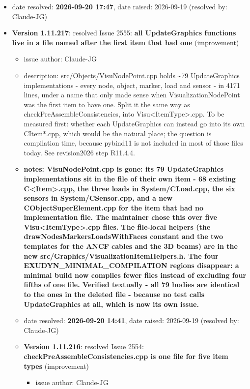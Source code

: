\begin{itemize}
\begin{itemize}
\begin{itemize}
\begin{itemize}
    \item   date resolved: {\bf 2026-09-20 17:47},
date raised: 2026-09-19 (resolved by: Claude-JG)
  \ei
  \item[] {\bf Version 1.11.217}:  resolved Issue 2555: {\bf all UpdateGraphics functions live in a file named after the first item that had one}
(improvement)
\vspace{-6pt}   \begin{itemize} \setlength\itemsep{-1pt}
    \item issue author: Claude-JG
    \item {description: src/Objects/VisuNodePoint.cpp holds \textasciitilde{}79 UpdateGraphics implementations - every node, object, marker, load and sensor - in 4171 lines, under a name that only made sense when VisualizationNodePoint was the first item to have one. Split it the same way as checkPreAssembleConsistencies, into Visu<ItemType>.cpp. To be measured first: whether each UpdateGraphics can instead go into its own CItem*.cpp, which would be the natural place; the question is compilation time, because pybind11 is not included in most of those files today. See revision2026 step R11.4.4.}
    \item {\bf notes: VisuNodePoint.cpp is gone: its 79 UpdateGraphics implementations sit in the file of their own item - 68 existing C<Item>.cpp, the three loads in System/CLoad.cpp, the six sensors in System/CSensor.cpp, and a new CObjectSuperElement.cpp for the item that had no implementation file. The maintainer chose this over five Visu<ItemType>.cpp files. The file-local helpers (the drawNodesMarkersLoadsWithFaces constant and the two templates for the ANCF cables and the 3D beams) are in the new src/Graphics/VisualizationItemHelpers.h. The four EXUDYN\_MINIMAL\_COMPILATION regions disappear: a minimal build now compiles fewer files instead of excluding four fifths of one file. Verified textually - all 79 bodies are identical to the ones in the deleted file - because no test calls UpdateGraphics at all, which is now its own issue.}
    \item   date resolved: {\bf 2026-09-20 14:41},
date raised: 2026-09-19 (resolved by: Claude-JG)
  \ei
  \item[] {\bf Version 1.11.216}:  resolved Issue 2554: {\bf checkPreAssembleConsistencies.cpp is one file for five item types}
(improvement)
\vspace{-6pt}   \begin{itemize} \setlength\itemsep{-1pt}
    \item issue author: Claude-JG

\end{itemize}
\end{itemize}
\end{itemize}
\end{itemize}
\end{itemize}
\end{itemize}

